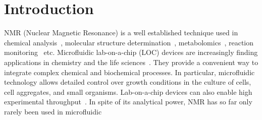 \documentclass[preprint,5p]{elsarticle}
\begin{document}
\section{Introduction}	
\label{sec:intro}
NMR (Nuclear Magnetic Resonance) is a well established technique used in chemical 
analysis~\cite{NMR-chemical-1995, hills1994magnetic, rabenstein1991quantitative},
molecular structure determination~\cite{wuthrich1990protein}, metabolomics~\cite{nmr-metabolomics-future-2017,nmr-metabolomics-2016}, reaction 
monitoring~\cite{maiwald2004quantitative} etc. Microfluidic lab-on-a-chip (LOC) devices 
are increasingly finding applications in chemistry and the life 
sciences~\cite{whitesides2006origins,mark2010microfluidic}. 
They provide a convenient way to integrate complex chemical and biochemical processes. 
In particular, microfluidic technology allows detailed control over growth conditions 
in the culture of cells, cell aggregates, and small organisms. 
Lab-on-a-chip devices can also enable high experimental 
throughput~\cite{cellonchip-2006,cellonchip-review,tissueonchip-2008}. 
In spite of its analytical power, NMR has so far only rarely been used in microfluidic 
\end{document}
